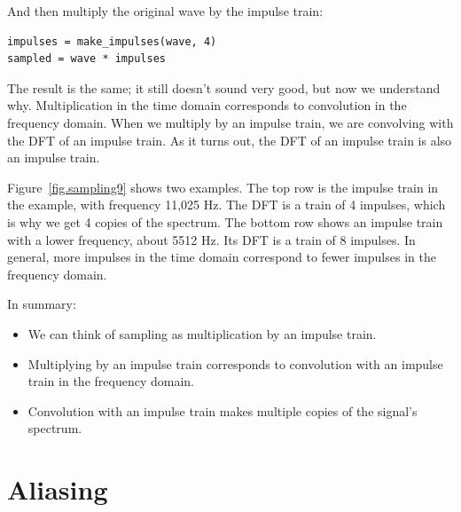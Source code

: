 \documentclass[12pt]{book}
\begin{document}
And then multiply the original wave by the impulse train:
 
\begin{verbatim}
impulses = make_impulses(wave, 4)
sampled = wave * impulses
\end{verbatim}

The result is the same; it still doesn't sound very good, but now
we understand why.  Multiplication in the time domain corresponds
to convolution in the frequency domain.  When we multiply
by an impulse train, we are convolving with the DFT of an
impulse train.  As it turns out, the DFT of an impulse
train is also an impulse train. 

Figure~\ref{fig.sampling9} shows two examples.  The top row is
the impulse train in the example, with frequency 11,025 Hz.
The DFT is a train of 4 impulses, which is why we get 4 copies
of the spectrum.  The bottom row shows an impulse
train with a lower frequency, about 5512 Hz.  Its DFT is a train
of 8 impulses.  In general, more impulses in the time
domain correspond to fewer impulses in the frequency
domain.

In summary:

\begin{itemize}

\item We can think of sampling as multiplication by an impulse train.

\item Multiplying by an impulse train corresponds
to convolution with an impulse train in the frequency domain.

\item Convolution with an impulse train makes multiple copies of the
signal's spectrum.

\end{itemize}


\section{Aliasing}
\end{document}
